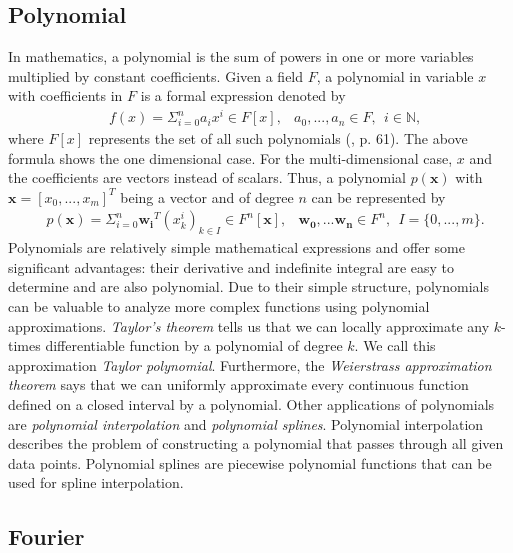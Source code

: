 \subsection{Polynomial}
In mathematics, a polynomial is the sum of powers in one or more variables multiplied by constant coefficients. Given a field $F$, a polynomial in variable $x$ with coefficients in $F$ is a formal expression denoted by
\begin{align*}
  &f(x) = \Sigma_{i=0}^{n} a_i x^i \in F[x], &a_0, ..., a_n \in F, \ \ i \in \mathbb{N},
\end{align*}
where $F[x]$ represents the set of all such polynomials (\citet{fischer2014}, p. 61). The above formula shows the one dimensional case. For the multi-dimensional case, $x$ and the coefficients are vectors instead of scalars. Thus, a polynomial $p(\mathbf{x})$ with $\mathbf{x} = [x_0, ..., x_m]^T$ being a vector and of degree $n$ can be represented by
\begin{align*}
  &p(\mathbf{x}) = \Sigma_{i=0}^{n} \mathbf{w_i}^T (x_k^i)_{k \in I} \in F^n[\mathbf{x}], &\mathbf{w_0}, ... \mathbf{w_n} \in F^n, \ \ I = \{0, ..., m\}.
\end{align*}
Polynomials are relatively simple mathematical expressions and offer some significant advantages: their derivative and indefinite integral are easy to determine and are also polynomial. Due to their simple structure, polynomials can be valuable to analyze more complex functions using polynomial approximations. \textit{Taylor's theorem} tells us that we can locally approximate any $k$-times differentiable function by a polynomial of degree $k$. We call this approximation \textit{Taylor polynomial}. Furthermore, the \textit{Weierstrass approximation theorem} says that we can uniformly approximate every continuous function defined on a closed interval by a polynomial. Other applications of polynomials are \textit{polynomial interpolation} and \textit{polynomial splines}. Polynomial interpolation describes the problem of constructing a polynomial that passes through all given data points. Polynomial splines are piecewise polynomial functions that can be used for spline interpolation.


\subsection{Fourier}

